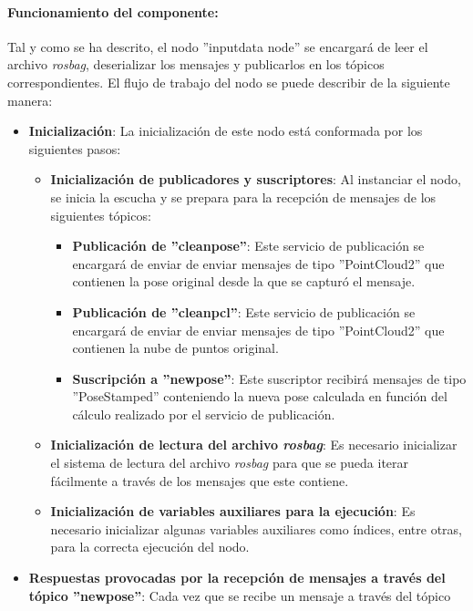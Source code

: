 \documentclass[12pt, a4paper, twoside]{article}
\begin{document}
\paragraph{Funcionamiento del componente:}
Tal y como se ha descrito, el nodo ''input\textunderscore data \textunderscore node'' se encargará de leer el archivo \textit{rosbag}, deserializar los mensajes y
publicarlos en los tópicos correspondientes. El flujo de trabajo del nodo se puede describir de la siguiente manera:

\begin{itemize}
  \item \textbf{Inicialización}: La inicialización de este nodo está conformada por los siguientes pasos:
  \begin{itemize}
    \item \textbf{Inicialización de publicadores y suscriptores}: Al instanciar el nodo, se inicia la escucha y se prepara para la recepción de mensajes de los 
    siguientes tópicos:
    \begin{itemize}
      \item \textbf{Publicación de ''clean\textunderscore pose''}: Este servicio de publicación se encargará de enviar de enviar mensajes de tipo ''PointCloud2'' que 
      contienen la pose original desde la que se capturó el mensaje.
      \item \textbf{Publicación de ''clean\textunderscore pcl''}: Este servicio de publicación se encargará de enviar de enviar mensajes de tipo ''PointCloud2'' que 
      contienen la nube de puntos original.
      \item \textbf{Suscripción a ''new\textunderscore pose''}: Este suscriptor recibirá mensajes de tipo ''PoseStamped'' conteniendo la nueva pose calculada en función 
      del cálculo realizado por el servicio de publicación.
    \end{itemize}
    \item \textbf{Inicialización de lectura del archivo \textit{rosbag}}: Es necesario inicializar el sistema de lectura del archivo \textit{rosbag} para que se pueda iterar fácilmente
    a través de los mensajes que este contiene.
    \item \textbf{Inicialización de variables auxiliares para la ejecución}: Es necesario inicializar algunas variables auxiliares como índices, entre otras,  
    para la correcta ejecución del nodo.
  \end{itemize}
  \item \textbf{Respuestas provocadas por la recepción de mensajes a través del tópico ''new\textunderscore pose''}: Cada vez que se recibe un mensaje a través del tópico 

\end{itemize}
\end{document}
